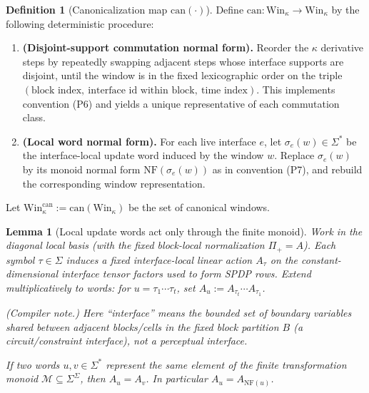 \documentclass[12pt]{article}
\newtheorem{lemma}[theorem]{Lemma}
\theoremstyle{definition}
\newtheorem{definition}{Definition}
\theoremstyle{definition}
\theoremstyle{remark}
\theoremstyle{remark}
\begin{document}
\begin{definition}[Canonicalization map $\mathrm{can}(\cdot)$]
\label{def:can-map}
Define $\mathrm{can}:\mathrm{Win}_\kappa\to \mathrm{Win}_\kappa$ by the following deterministic procedure:

\begin{enumerate}
\item \textbf{(Disjoint-support commutation normal form).} Reorder the $\kappa$ derivative
steps by repeatedly swapping adjacent steps whose interface supports are disjoint, until the
window is in the fixed lexicographic order on the triple
$(\text{block index},\ \text{interface id within block},\ \text{time index})$.
This implements convention (P6) and yields a unique representative of each commutation class.

\item \textbf{(Local word normal form).} For each live interface $e$, let $\sigma_e(w)\in\Sigma^*$
be the interface-local update word induced by the window $w$. Replace $\sigma_e(w)$
by its monoid normal form $\mathrm{NF}(\sigma_e(w))$ as in convention (P7), and rebuild
the corresponding window representation.
\end{enumerate}

Let $\mathrm{Win}^{\mathrm{can}}_\kappa := \mathrm{can}(\mathrm{Win}_\kappa)$ be the set of canonical windows.
\end{definition}

\begin{lemma}[Local update words act only through the finite monoid]
\label{lem:local-monoid-action}
Work in the diagonal local basis (with the fixed block-local normalization $\Pi_+=A$).
Each symbol $\tau\in\Sigma$ induces a fixed interface-local linear action $A_\tau$ on the
constant-dimensional interface tensor factors used to form SPDP rows.
Extend multiplicatively to words: for $u=\tau_1\cdots\tau_t$, set $A_u := A_{\tau_t}\cdots A_{\tau_1}$.

\emph{(Compiler note.)} Here ``interface'' means the bounded set of boundary variables shared between
adjacent blocks/cells in the fixed block partition $B$ (a circuit/constraint interface), not a perceptual interface.

If two words $u,v\in\Sigma^*$ represent the same element of the finite transformation monoid
$\mathcal{M}\subseteq \Sigma^\Sigma$, then $A_u = A_v$. In particular $A_u = A_{\mathrm{NF}(u)}$.
\end{lemma}
\end{document}
